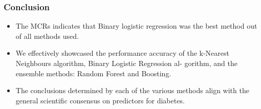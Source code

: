 \documentclass{beamer}
\begin{document}
\begin{frame}
    \frametitle{Conclusion}
        \begin{itemize}
            \item The MCRs indicates that Binary logistic regression was the best method out of all methods used.
            \item We effectively showcased
            the performance accuracy of the k-Nearest Neighbours algorithm, Binary Logistic Regression al-
            gorithm, and the ensemble methods: Random Forest and Boosting. 
            \item The conclusions
            determined by each of the various methods align with the general scientific consensus on predictors for diabetes.
        \end{itemize}
\end{frame}

\end{document}

